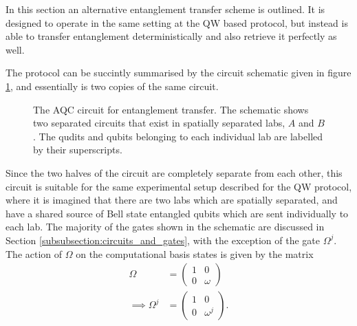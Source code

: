 In this section an alternative entanglement transfer scheme is outlined.
It is designed to operate in the same setting at the QW based protocol, but instead is able to transfer entanglement deterministically and also retrieve it perfectly as well.

The protocol can be succintly summarised by the circuit schematic given in figure \ref{fig:aqc_circuit_schematic}, and essentially is two copies of the same circuit.

\begin{figure}[h]
    \begin{center}
    \caption{The AQC circuit for entanglement transfer. The schematic shows two separated circuits that exist in spatially separated labs, $A$ and $B$. The qudits and qubits belonging to each individual lab are labelled by their superscripts.}
    \label{fig:aqc_circuit_schematic}
    \end{center}
\end{figure}
Since the two halves of the circuit are completely separate from each other, this circuit is suitable for the same experimental setup described for the QW protocol, where it is imagined that there are two labs which are spatially separated, and have a shared source of Bell state entangled qubits which are sent individually to each lab.
The majority of the gates shown in the schematic are discussed in Section \ref{subsubsection:circuits_and_gates}, with the exception of the gate $\Omega^j$.
The action of $\Omega$ on the computational basis states is given by the matrix
\begin{align}
    \Omega &= 
    \begin{pmatrix}
        1 & 0\\
        0 & \omega
    \end{pmatrix}\\
    \implies \Omega^j &=
    \begin{pmatrix}
        1 & 0\\
        0 & \omega^j
    \end{pmatrix}.
\end{align}
